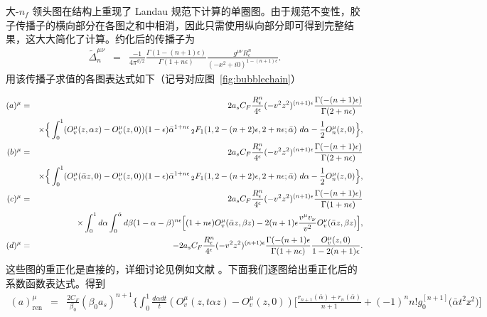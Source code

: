 大-$n_f$ 领头图在结构上重现了 Landau 规范下计算的单圈图。由于规范不变性，胶子传播子的横向部分在各图之和中相消，因此只需使用纵向部分即可得到完整结果，这大大简化了计算。约化后的传播子为
\begin{eqnarray}
\tilde \Delta_n^{\mu\nu}&=&\frac{-1}{4\pi^{d/2}}
\frac{\Gamma(1-(n+1)\epsilon)}{\Gamma(1+n\epsilon)}\frac{g^{\mu\nu} R_\epsilon^n}{(-x^2+i0)^{1-(n+1)\epsilon}}.
\end{eqnarray}
用该传播子求值的各图表达式如下（记号对应图~\ref{fig:bubblechain}）
\begin{widetext}
\begin{eqnarray}
(a)^\mu &=&2a_sC_F \frac{R_\epsilon^n}{4^\epsilon}(-v^2z^2)^{(n+1)\epsilon}\frac{\Gamma(-(n+1)\epsilon)}{\Gamma(2+n\epsilon)}
\\&& \nonumber \hfill
\times\Big\{\int_0^1  
(O_v^\mu(z,\alpha z)-O_v^\mu(z,0))(1-\epsilon)\bar \alpha^{1+n\epsilon}\,_2F_1(1,2-(n+2)\epsilon,2+n\epsilon;\bar \alpha)~d\alpha-\frac{1}{2}O^\mu_n(z,0)\Big\},
\\
(b)^\mu &=&2a_sC_F \frac{R_\epsilon^n}{4^\epsilon}(-v^2z^2)^{(n+1)\epsilon}\frac{\Gamma(-(n+1)\epsilon)}{\Gamma(2+n\epsilon)}
\\&& \nonumber \hfill
\times\Big\{\int_0^1  
(O_v^\mu(\bar \alpha z,0)-O_v^\mu(z,0))(1-\epsilon)\bar \alpha^{1+n\epsilon}\,_2F_1(1,2-(n+2)\epsilon,2+n\epsilon;\bar \alpha)~d\alpha-\frac{1}{2}O^\mu_n(z,0)\Big\},
\\
(c)^\mu &=&2a_sC_F \frac{R_\epsilon^n}{4^\epsilon}(-v^2z^2)^{(n+1)\epsilon}\frac{\Gamma(-(n+1)\epsilon)}{\Gamma(1+n\epsilon)}
\\&& \nonumber \hfill
\times\int_0^1  d\alpha \int_0^{\bar \alpha} d\beta (1-\alpha-\beta)^{n\epsilon}\Big[(1+n\epsilon)O_v^\mu(\bar \alpha z,\beta z)-2(n+1)\epsilon \frac{v^\mu v_\nu}{v^2}O^\nu_v(\bar \alpha z,\beta z)\Big],
\\
(d)^\mu &=&-2a_sC_F \frac{R_\epsilon^n}{4^\epsilon}(-v^2z^2)^{(n+1)\epsilon}\frac{\Gamma(-(n+1)\epsilon}{\Gamma(1+n\epsilon)}\frac{O^\mu_v(z,0)}{1-2(n+1)\epsilon}.
\end{eqnarray}
这些图的重正化是直接的，详细讨论见例如文献 \cite{Beneke:1995pq}。下面我们逐图给出重正化后的系数函数表达式。得到
\begin{eqnarray}\label{app:a}
(a)^\mu_{\text{ren}}&=&\frac{2C_F}{\beta_0}(\beta_0 a_s)^{n+1}\biggl\{\int_0^1 \frac{d\alpha dt}{t} (O_v^\mu(z,t\alpha z)-O_v^\mu(z,0))\Big[
\frac{r_{n+1}(\bar \alpha)+r_n(\bar \alpha)}{n+1}+(-1)^nn!g_0^{[n+1]}\big(\bar \alpha t^2 \mathbb{z}^2\big)\Big]
\\\nonumber && 

\end{eqnarray}
\end{widetext}

